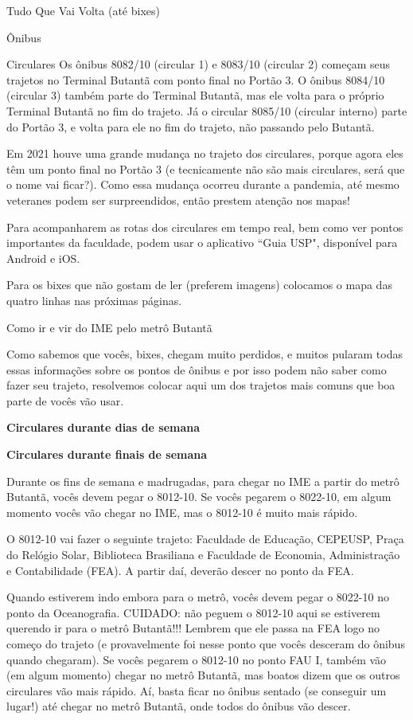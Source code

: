 \begin{secao}{Tudo Que Vai Volta (até bixes)}
\begin{subsecao}{Ônibus}
\begin{subsubsecao}{Circulares}
Os ônibus 8082/10 (circular 1) e 8083/10 (circular 2) começam seus trajetos no 
Terminal Butantã com ponto final no Portão 3. O ônibus 8084/10 (circular 3) também 
parte do Terminal Butantã, mas ele volta para o próprio Terminal Butantã no fim do trajeto. 
Já o circular 8085/10 (circular interno) parte do Portão 3, e volta para ele no fim 
do trajeto, não passando pelo Butantã.

Em 2021 houve uma grande mudança no trajeto dos circulares, porque agora eles
têm um ponto final no Portão 3 (e tecnicamente não são mais circulares, será que
o nome vai ficar?). Como essa mudança ocorreu durante a pandemia, até mesmo
veteranes podem ser surpreendidos, então prestem atenção nos mapas!

Para acompanharem as rotas dos circulares em tempo real, bem como ver pontos
importantes da faculdade, podem usar o aplicativo ``Guia USP", disponível para
Android e iOS.

Para os bixes que não gostam de ler (preferem imagens) colocamos o
mapa das quatro linhas nas próximas páginas.



\end{subsubsecao}

\begin{subsubsecao}{Como ir e vir do IME pelo metrô Butantã}

Como sabemos que vocês, bixes, chegam muito perdidos, e muitos pularam todas
essas informações sobre os pontos de ônibus e por isso podem não saber como
fazer seu trajeto, resolvemos colocar aqui um dos trajetos mais comuns que boa
parte de vocês vão usar.

{\bf Circulares durante dias de semana}

{\bf Circulares durante finais de semana}

Durante os fins de semana e madrugadas, para chegar no IME 
a partir do metrô Butantã, vocês devem pegar o 8012-10. 
Se vocês pegarem o 8022-10, em algum momento vocês 
vão chegar no IME, mas o 8012-10 é muito mais rápido.

O 8012-10 vai fazer o seguinte trajeto: Faculdade de Educação, CEPEUSP,
Praça do Relógio Solar, Biblioteca Brasiliana e Faculdade de Economia,
Administração e Contabilidade (FEA). A partir daí, deverão descer no ponto da
FEA.

Quando estiverem indo embora para o metrô, vocês devem pegar o 8022-10
no ponto da Oceanografia. CUIDADO: não peguem o 8012-10 aqui
se estiverem querendo ir para o metrô Butantã!!! Lembrem que ele passa na
FEA logo no começo do trajeto (e provavelmente foi nesse ponto que vocês
desceram do ônibus quando chegaram). Se vocês pegarem o 8012-10
no ponto FAU I, também vão (em algum momento) chegar no metrô Butantã, mas
boatos dizem que os outros circulares vão mais rápido. Aí, basta ficar no
ônibus sentado (se conseguir um lugar!) até chegar no metrô Butantã, onde 
todos do ônibus vão descer.


\end{subsubsecao}
\end{subsecao}
\end{secao}
